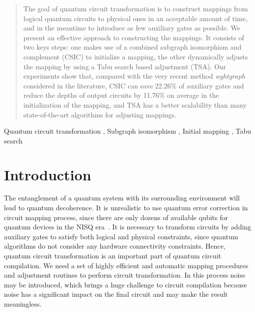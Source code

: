 \documentclass[journal]{IEEEtran}
\begin{document}
\begin{abstract}
The goal of quantum circuit transformation is to construct mappings from logical quantum circuits to physical ones in an acceptable amount of time, and in the meantime to introduce  as few auxiliary gates as possible. We present an effective approach to constructing the mappings. It consists of two keys steps: one makes use of a combined subgraph isomorphism and complement (CSIC) to initialize a mapping, the other dynamically adjusts the mapping by using a Tabu search based adjustment (TSA). Our experiments show that, compared with the very recent method \emph{wghtgraph} considered in the literature, CSIC can save 22.26\% of auxiliary gates and reduce the depths of output circuits by 11.76\% on average in the initialization of the mapping, and  TSA has a better scalability than many state-of-the-art algorithms for adjusting mappings.
\end{abstract}

\begin{IEEEkeywords}
Quantum circuit transformation  ,  Subgraph isomorphism , Initial mapping , Tabu search
\end{IEEEkeywords}

%
\IEEEpeerreviewmaketitle
\section{Introduction}

The entanglement of a quantum system with its surrounding environment will lead to quantum decoherence. It is unrealistic to use quantum error correction in circuit mapping process, since there are only dozens of available qubits for quantum devices in the NISQ era~\cite{2018QuantumPreskill}. It is necessary to transform circuits by adding auxiliary gates to satisfy both logical and physical constraints, since quantum algorithms do not consider any hardware connectivity constraints. Hence, quantum circuit transformation is an important part of quantum circuit compilation. We need a set of highly efficient and automatic mapping procedures and adjustment routines to perform circuit transformation. In this process noise may be introduced, which brings a huge challenge to circuit compilation because noise has a significant impact on the final circuit and may make the result meaningless. 
\end{document}

